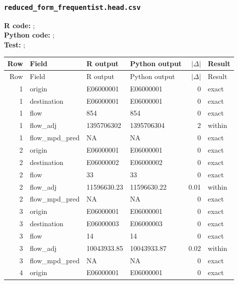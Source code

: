 \documentclass[10pt]{article}
\begin{document}
\subsubsection{\texorpdfstring{\texttt{reduced\_form\_frequentist.head.csv}}{reduced\_form\_frequentist.head.csv}}
{\footnotesize \textbf{R code:} ; \\ \textbf{Python code:} ; \\ \textbf{Test:} ; \par}

\small
\begin{longtable}{@{}r p{}p{}p{}rl@{}}
\toprule
Row & Field & R output & Python output & $|\Delta|$ & Result \\
\midrule
\endfirsthead
\toprule
Row & Field & R output & Python output & $|\Delta|$ & Result \\
\midrule
\endhead
1 & origin & E06000001 & E06000001 & 0 & exact \\
1 & destination & E06000001 & E06000001 & 0 & exact \\
1 & flow & 854 & 854 & 0 & exact \\
1 & flow\_\allowbreak{}adj & 1395706302 & 1395706304 & \num{2} & within \\
1 & flow\_\allowbreak{}mpd\_\allowbreak{}pred & NA & NA & 0 & exact \\
2 & origin & E06000001 & E06000001 & 0 & exact \\
2 & destination & E06000002 & E06000002 & 0 & exact \\
2 & flow & 33 & 33 & 0 & exact \\
2 & flow\_\allowbreak{}adj & 11596630.23 & 11596630.22 & \num{0.01} & within \\
2 & flow\_\allowbreak{}mpd\_\allowbreak{}pred & NA & NA & 0 & exact \\
3 & origin & E06000001 & E06000001 & 0 & exact \\
3 & destination & E06000003 & E06000003 & 0 & exact \\
3 & flow & 14 & 14 & 0 & exact \\
3 & flow\_\allowbreak{}adj & 10043933.85 & 10043933.87 & \num{0.02} & within \\
3 & flow\_\allowbreak{}mpd\_\allowbreak{}pred & NA & NA & 0 & exact \\
4 & origin & E06000001 & E06000001 & 0 & exact \\

\end{longtable}
\end{document}
